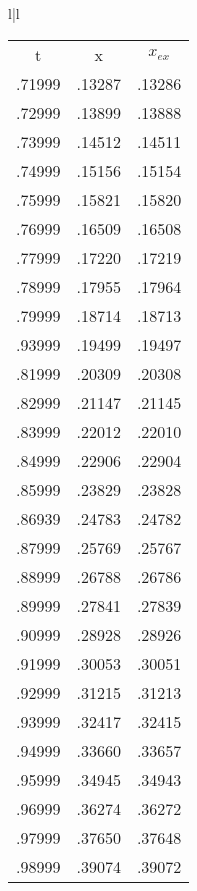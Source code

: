 \begin{figure}
    \centering
    \begin{tabular}{l|l}
        \begin{tabular}{ccc}
            \multicolumn{1}{c}{t} &  \multicolumn{1}{c}{x}  & \multicolumn{1}{c}{$x_{ex}$}\\
            .71999 & .13287 & .13286 \\  
            .72999 & .13899 & .13888 \\  
            .73999 & .14512 & .14511 \\  
            .74999 & .15156 & .15154 \\  
            .75999 & .15821 & .15820 \\  
            .76999 & .16509 & .16508 \\  
            .77999 & .17220 & .17219 \\  
            .78999 & .17955 & .17964 \\  
            .79999 & .18714 & .18713 \\  
            .93999 & .19499 & .19497 \\  
            .81999 & .20309 & .20308 \\  
            .82999 & .21147 & .21145 \\  
            .83999 & .22012 & .22010 \\  
            .84999 & .22906 & .22904 \\  
            .85999 & .23829 & .23828 \\  
            .86939 & .24783 & .24782 \\  
            .87999 & .25769 & .25767 \\  
            .88999 & .26788 & .26786 \\  
            .89999 & .27841 & .27839 \\  
            .90999 & .28928 & .28926 \\  
            .91999 & .30053 & .30051 \\  
            .92999 & .31215 & .31213 \\  
            .93999 & .32417 & .32415 \\  
            .94999 & .33660 & .33657 \\  
            .95999 & .34945 & .34943 \\  
            .96999 & .36274 & .36272 \\  
            .97999 & .37650 & .37648 \\  
            .98999 & .39074 & .39072 \\  

\end{tabular}
\end{tabular}
\end{figure}
